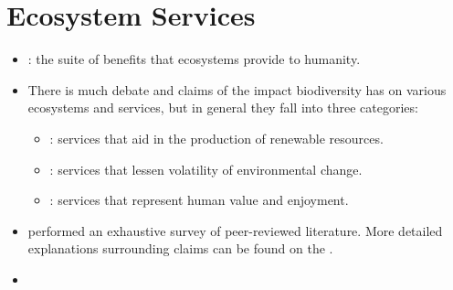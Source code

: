 \documentclass{inVerba-notes}
\begin{document}
\section{Ecosystem Services}
\begin{itemize}
    \item {}: the suite of benefits that ecosystems provide to humanity.
    \item There is much debate and claims of the impact biodiversity has on various ecosystems and services, but in general they fall into three categories: 
        \begin{itemize}
            \item {}: services that aid in the production of renewable resources.
            \item {}: services that lessen volatility of environmental change.
            \item {}: services that represent human value and enjoyment.
        \end{itemize}
    \item {} performed an exhaustive survey of peer-reviewed literature. More detailed explanations surrounding claims can be found on the . 
    \item {}
\end{itemize}
\end{document}
